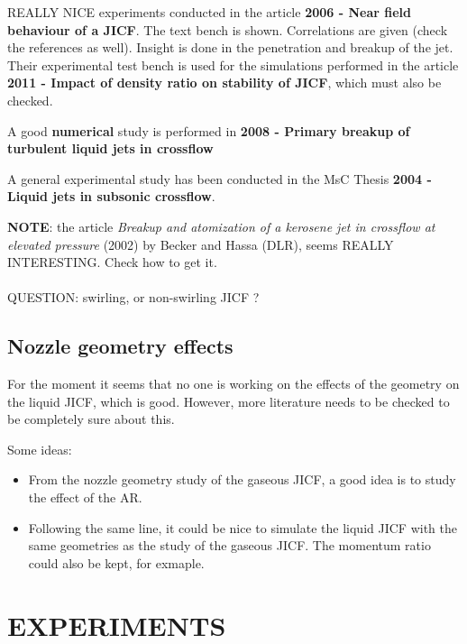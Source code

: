 REALLY NICE experiments conducted in the article \textbf{2006 - Near field behaviour of a JICF}. The text bench is shown. Correlations are given (check the references as well). Insight is done in the penetration and breakup of the jet. Their experimental test bench is used for the simulations performed in the article \textbf{2011 - Impact of density ratio on stability of JICF}, which must also be checked.

A good \textbf{numerical} study is performed in \textbf{2008 - Primary breakup of turbulent liquid jets in crossflow}

A general experimental study has been conducted in the MsC Thesis \textbf{2004 - Liquid jets in subsonic crossflow}.

\textbf{NOTE}: the article \textsl{Breakup and atomization of a kerosene jet in crossflow at elevated pressure} (2002) by Becker and Hassa (DLR), seems REALLY INTERESTING. Check how to get it. \\\\

QUESTION: swirling, or non-swirling JICF ?

\subsection{Nozzle geometry effects}

For the moment it seems that no one is working on the effects of the geometry on the liquid JICF, which is good. However, more literature needs to be checked to be completely sure about this.

Some ideas:

\begin{itemize}

	\item From the nozzle geometry study of the gaseous JICF, a good idea is to study the effect of the AR.
	
	\item Following the same line, it could be nice to simulate the liquid JICF with the same geometries as the study of the gaseous JICF. The momentum ratio could also be kept, for exmaple.

\end{itemize}

\section{EXPERIMENTS}

